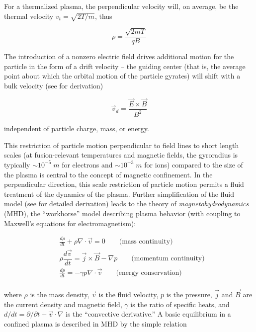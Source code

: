 \noindent For a thermalized plasma, the perpendicular velocity will, on average, be the thermal velocity $v_t = \sqrt{2T/m}$, thus

\begin{equation}\label{eq:gyroradius2}
 \rho = \frac{\sqrt{2mT}}{qB}
\end{equation}

\noindent The introduction of a nonzero electric field drives additional motion for the particle in the form of a drift velocity -- the guiding center (that is, the average point about which the orbital motion of the particle gyrates) will shift with a bulk velocity (see \cite[\S~8.4]{Freidberg2007} for derivation)

\begin{equation}\label{eq:exb}
 \vec{v}_d = \frac{\vec{E} \times \vec{B}}{B^2}
\end{equation}

\noindent independent of particle charge, mass, or energy.

This restriction of particle motion perpendicular to field lines to short length scales (at fusion-relevant temperatures and magnetic fields, the gyroradius is typically $\sim 10^{-5} \;\si{m}$ for electrons and $\sim 10^{-3} \;\si{m}$ for ions) compared to the size of the plasma is central to the concept of magnetic confinement.  In the perpendicular direction, this scale restriction of particle motion permits a fluid treatment of the dynamics of the plasma.  Further simplification of the fluid model (see \cite[\S~2.3]{Freidberg1987} for detailed derivation) leads to the theory of \emph{magnetohydrodynamics} (MHD), the ``workhorse'' model describing plasma behavior (with coupling to Maxwell's equations for electromagnetism): 

\begin{equation}\label{eq:MHD}
 \begin{aligned}
  &\frac{d \rho}{d t} + \rho \nabla \cdot \vec{v} = 0 \qquad \mbox{(mass continuity)}\\
  &\rho \dfrac{d\vec{v}}{dt} = \vec{j} \times \vec{B} - \nabla p \qquad \mbox{(momentum continuity)}\\
  &\frac{dp}{dt} = -\gamma p \nabla \cdot \vec{v} \qquad \mbox{(energy conservation)}\\
 \end{aligned}
\end{equation}  

\noindent where $\rho$ is the mass density, $\vec{v}$ is the fluid velocity, $p$ is the pressure, $\vec{j}$ and $\vec{B}$ are the current density and magnetic field, $\gamma$ is the ratio of specific heats, and $d/dt = \partial/\partial t + \vec{v} \cdot \nabla$ is the ``convective derivative.''  A basic equilibrium in a confined plasma is described in MHD by the simple relation

